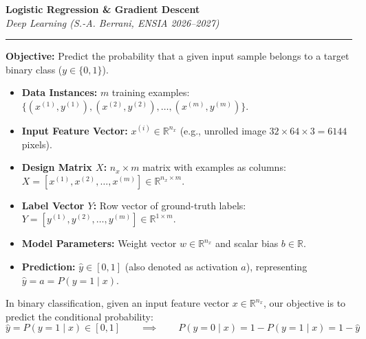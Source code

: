 \documentclass[10pt,a4paper]{article}
\begin{document}
\begin{center}
    {\LARGE\bfseries\color{themeblue} Logistic Regression \& Gradient Descent}\\[2pt]
    {\small\itshape Deep Learning (S.-A. Berrani, ENSIA 2026--2027)}\\[2pt]
    \textcolor{themeblue}{\rule{\textwidth}{0.6pt}}
\end{center}

\vspace{-9pt}

\begin{tcolorbox}[
    colframe=themeblue,
    colback=lightbg,
    coltitle=white,
    fonttitle=\bfseries\sffamily,
    title={Problem Formulation \& Notation},
    arc=1.6mm,
    boxrule=0.6pt,
    left=6pt, right=6pt, top=3pt, bottom=3pt
]
\textbf{Objective:} Predict the probability that a given input sample belongs to a target binary class ($y \in \{0, 1\}$).
\begin{itemize}[leftmargin=12pt, itemsep=1pt, topsep=1pt]
    \item \textbf{Data Instances:} $m$ training examples: $\{(x^{(1)}, y^{(1)}), (x^{(2)}, y^{(2)}), \dots, (x^{(m)}, y^{(m)})\}$.
    \item \textbf{Input Feature Vector:} $x^{(i)} \in \mathbb{R}^{n_x}$ (e.g., unrolled image $32 \times 64 \times 3 = 6144$ pixels).
    \item \textbf{Design Matrix $X$:} $n_x \times m$ matrix with examples as columns: $X = [x^{(1)}, x^{(2)}, \dots, x^{(m)}] \in \mathbb{R}^{n_x \times m}$.
    \item \textbf{Label Vector $Y$:} Row vector of ground-truth labels: $Y = [y^{(1)}, y^{(2)}, \dots, y^{(m)}] \in \mathbb{R}^{1 \times m}$.
    \item \textbf{Model Parameters:} Weight vector $w \in \mathbb{R}^{n_x}$ and scalar bias $b \in \mathbb{R}$.
    \item \textbf{Prediction:} $\hat{y} \in [0, 1]$ (also denoted as activation $a$), representing $\hat{y} = a = P(y = 1 \mid x)$.
\end{itemize}
\end{tcolorbox}

\vspace{1pt}

\par\vspace{2pt}
In binary classification, given an input feature vector $x \in \mathbb{R}^{n_x}$, our objective is to predict the conditional probability:
\[
\hat{y} = P(y = 1 \mid x) \in [0, 1] \qquad \implies \qquad P(y = 0 \mid x) = 1 - P(y = 1 \mid x) = 1 - \hat{y}
\]
\end{document}
